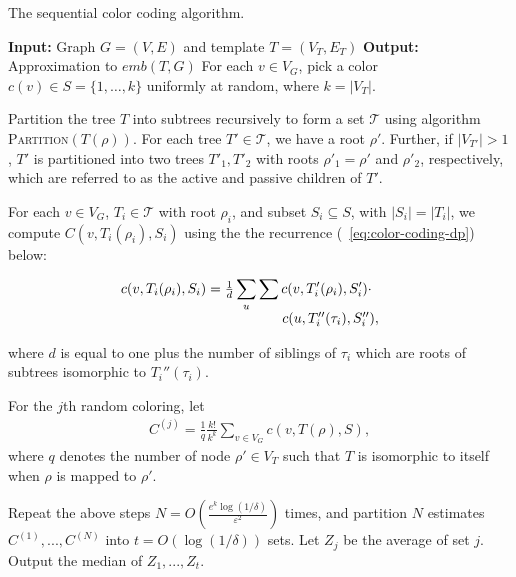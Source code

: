
\begin{algorithm}[ht]
  \caption{The sequential color coding algorithm.}
  \label{alg:sequential}
  \begin{algorithmic}[1]
\STATE \textbf{Input:} Graph $G=(V, E)$ and template $T=(V_T, E_T)$
\STATE \textbf{Output:} Approximation to $emb(T, G)$
\STATE
\STATE For each $v\in V_G$, pick a color $c(v)\in S=\{1,\ldots,k\}$ uniformly at random,
where $k=|V_T|$.

\STATE Partition the tree $T$ into subtrees recursively to form a set $\mathcal{T}$
using algorithm \textsc{Partition}$(T(\rho))$. For each tree $T'\in\mathcal{T}$,
we have a root $\rho'$. Further, if $|V_{T'}|>1$, $T'$ is partitioned into
two trees $T'_1, T'_2$ with roots $\rho'_1=\rho'$ and $\rho'_2$, respectively,
which are referred to as the active and passive children of $T'$.

\STATE For each $v\in V_G$, $T_i\in\mathcal{T}$ with root $\rho_i$, and subset $S_i\subseteq S$,
with $|S_i|=|T_i|$, we compute $C(v, T_i(\rho_i), S_i)$ using the the recurrence
(~\ref{eq:color-coding-dp}) below:

\begin{equation}
\label{eq:color-coding-dp}
\begin{array}{lcl}
\hspace*{-0.2in}c(v, T_i(\rho_i), S_i) = \frac{1}{d}\displaystyle\sum\limits_{u}
\displaystyle\sum c(v, T_i'(\rho_i), S_i') \cdot\\
\hspace*{1.4in}c(u, T_i''(\tau_i), S_i''),
\end{array}
\end{equation}

where $d$ is equal to one plus the number of siblings of
$\tau_i$ which are roots of subtrees isomorphic to $T_i''(\tau_i)$.

\STATE For the $j$th random coloring, let
\begin{equation}
\label{eq:color-coding-sum}
\begin{array}{lcl}
C^{(j)} = \frac{1}{q}\frac{k!}{k^k}\sum_{ v \in V_G} c(v, T(\rho), S),
\end{array}
\end{equation}
where $q$ denotes the number of node $\rho' \in
V_T$ such that $T$ is isomorphic to itself when $\rho$ is mapped to $\rho'$.

\STATE
Repeat the above steps $N=O(\frac{e^k\log(1/\delta)}{\varepsilon^2})$ times,
and partition $N$ estimates $C^{(1)},...,C^{(N)}$ into $t=O(\log(1/\delta))$ sets. Let
$Z_j$ be the average of set $j$. Output the median of $Z_1,...,Z_t$.
  \end{algorithmic}
\end{algorithm}




